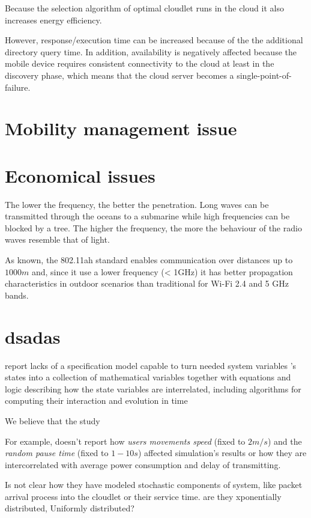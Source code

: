 \documentclass[sigchi]{acmart}
\begin{document}
Because the selection algorithm of optimal cloudlet runs in the cloud it also increases energy efficiency. 

However, response/execution time can be increased because of the the additional directory
query time. In addition, availability is negatively affected
because the mobile device requires consistent connectivity to
the cloud at least in the discovery phase, which means that
the cloud server becomes a single-point-of-failure.

\section{Mobility management issue}

\section{Economical issues}

The lower the frequency, the better the penetration. Long waves can be transmitted through the oceans to a submarine while high frequencies can be blocked by a tree. The higher the frequency, the more the behaviour of the radio waves resemble that of light.

As known, the 802.11ah standard enables communication over distances up to $1000 m$ and, since it use a lower frequency (< 1GHz) it has better propagation characteristics in outdoor scenarios than traditional for Wi-Fi 2.4 and 5 GHz bands. 



\section{dsadas}

\citet{MSAReport} report lacks of a specification model capable to turn needed system variables 
’s states into a collection of mathematical variables together with equations and logic describing how the state variables are interrelated, including algorithms for computing their interaction and evolution in time

We believe that the study 

For example, \citet{MSAReport} doesn't report how \textit{users movements speed} (fixed to $2 m/s$) and the \textit{random pause time} (fixed to $1-10 s$) affected simulation's results or how they are intercorrelated with average power consumption and delay of transmitting.

Is not clear how they have modeled stochastic components of system, like packet arrival process into the cloudlet or their service time.
are they xponentially distributed, Uniformly distributed?
\end{document}
